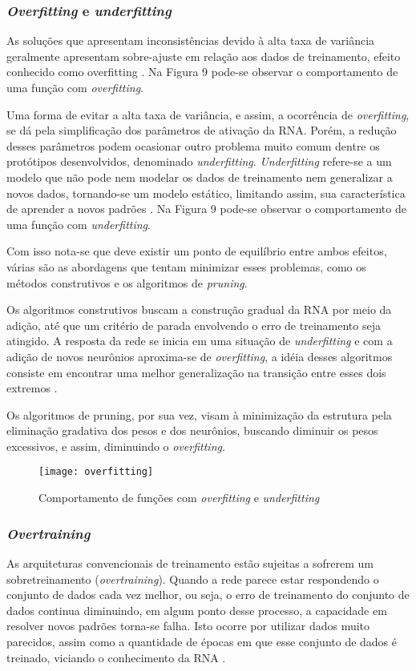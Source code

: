 \subsubsection{\textit{Overfitting} e \textit{underfitting}}
As soluções que apresentam inconsistências devido à alta taxa de variância geralmente apresentam sobre-ajuste em relação aos dados de treinamento, efeito conhecido como overfitting \cite{medeiros}. Na Figura 9 pode-se observar o comportamento de uma função com \textit{overfitting}.

Uma forma de evitar a alta taxa de variância, e assim, a ocorrência de \textit{overfitting}, se dá pela simplificação dos parâmetros de ativação da RNA. Porém, a redução desses parâmetros podem ocasionar outro problema muito comum dentre os protótipos desenvolvidos, denominado \textit{underfitting}. \textit{Underfitting} refere-se a um modelo que não pode nem modelar os dados de treinamento nem generalizar a novos dados, tornando-se um modelo estático, limitando assim, sua característica de aprender a novos padrões \cite{geman}. Na Figura 9 pode-se observar o comportamento de uma função com \textit{underfitting}.

Com isso nota-se que deve existir um ponto de equilíbrio entre ambos efeitos, várias são as abordagens que tentam minimizar esses problemas, como os métodos construtivos e os algoritmos de \textit{pruning}.

Os algoritmos construtivos buscam a construção gradual da RNA por meio da adição, até que um critério de parada envolvendo o erro de treinamento seja atingido. A resposta da rede se inicia em uma situação de \textit{underfitting} e com a adição de novos neurônios aproxima-se de \textit{overfitting}, a idéia desses algoritmos consiste em encontrar uma melhor generalização na transição entre esses dois extremos \cite{medeiros}.

Os algoritmos de pruning, por sua vez, visam à minimização da estrutura pela eliminação gradativa dos pesos e dos neurônios, buscando diminuir os pesos excessivos, e assim, diminuindo o \textit{overfitting}.

\begin{figure}[h]
	\centering
	\texttt{[image: overfitting]}
	\caption{Comportamento de funções com \textit{overfitting} e \textit{underfitting}}
	\label{overfittin-fig}
\end{figure}

\subsubsection{\textit{Overtraining}}
As arquiteturas convencionais de treinamento estão sujeitas a sofrerem um sobretreinamento (\textit{overtraining}). Quando a rede parece estar respondendo o conjunto de dados cada vez melhor, ou seja, o erro de treinamento do conjunto de dados continua diminuindo, em algum ponto desse processo, a capacidade em resolver novos padrões torna-se falha. Isto ocorre por utilizar dados muito parecidos, assim como a quantidade de épocas em que esse conjunto de dados é treinado, viciando o conhecimento da RNA \cite{haykin2000}.

